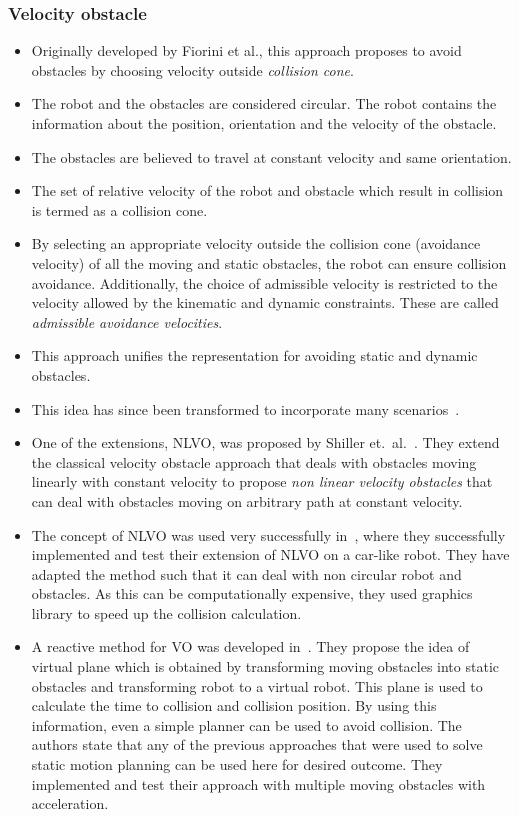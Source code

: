 \subsubsection{Velocity obstacle}%
\label{subsub:velocity_obstacle}

\begin{itemize}
\item Originally developed by Fiorini et al.\cite{fiorini1998motion}, this approach proposes to avoid obstacles by choosing velocity outside \textit{collision cone}.
\item The robot and the obstacles are considered circular. The robot contains the information about the position, orientation and the velocity of the obstacle.
\item The obstacles are believed to travel at constant velocity and same orientation.
\item The set of relative velocity of the robot and obstacle which result in collision is termed as a collision cone. 
\item By selecting an appropriate velocity outside the collision cone (avoidance velocity) of all the moving and static obstacles, the robot can ensure collision avoidance. Additionally, the choice of admissible velocity is restricted to the velocity allowed by the kinematic and dynamic constraints. These are called \textit{admissible avoidance velocities}.
\item This approach unifies the representation for avoiding static and dynamic obstacles.
\item This idea has since been transformed to incorporate many scenarios~\cite{prassler2001robotics}.
\item One of the extensions, NLVO, was proposed by Shiller et.\ al.~\cite{shiller2001motion}. They extend the classical velocity obstacle approach that deals with obstacles moving linearly with constant velocity to propose \textit{non linear velocity obstacles} that can deal with obstacles moving on arbitrary path at constant velocity.
\item The concept of NLVO was used very successfully in~\cite{large2005navigation}, where they successfully implemented and test their extension of NLVO on a car-like robot. They have adapted the method such that it can deal with non circular robot and obstacles. As this can be computationally expensive, they used graphics library to speed up the collision calculation.
\item A reactive method for VO was developed in~\cite{belkhouche2009reactive}. They propose the idea of virtual plane which is obtained by transforming moving obstacles into static obstacles and transforming robot to a virtual robot. This plane is used to calculate the time to collision and collision position. By using this information, even a simple planner can be used to avoid collision. The authors state that any of the previous approaches that were used to solve static motion planning can be used here for desired outcome. They implemented and test their approach with multiple moving obstacles with acceleration.

\end{itemize}
